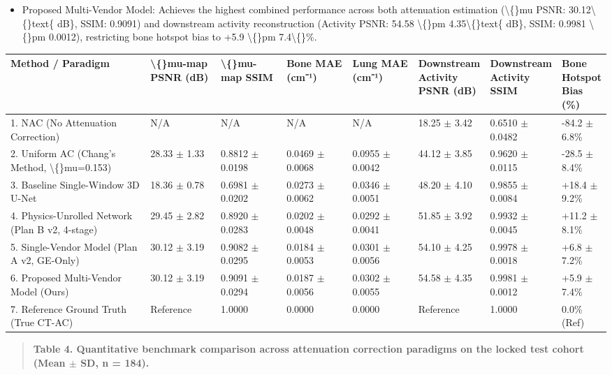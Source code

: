 \documentclass[11pt]{article}
\begin{document}
\begin{itemize}\item  Proposed Multi-Vendor Model: Achieves the highest combined performance across both attenuation estimation (\textbackslash\{\}mu PSNR: 30.12\textbackslash\{\}text\{ dB\}, SSIM: 0.9091) and downstream activity reconstruction (Activity PSNR: 54.58 \textbackslash\{\}pm 4.35\textbackslash\{\}text\{ dB\}, SSIM: 0.9981 \textbackslash\{\}pm 0.0012), restricting bone hotspot bias to +5.9 \textbackslash\{\}pm 7.4\textbackslash\{\}\%.\end{itemize}
\begingroup\small\setlength{\tabcolsep}{3pt}\begin{longtable}{p{0.32\linewidth}p{0.14\linewidth}p{0.14\linewidth}p{0.14\linewidth}p{0.14\linewidth}p{0.14\linewidth}p{0.14\linewidth}p{0.14\linewidth}}
\toprule
Method / Paradigm & \textbackslash\{\}mu-map PSNR (dB) & \textbackslash\{\}mu-map SSIM & Bone MAE (cm⁻¹) & Lung MAE (cm⁻¹) & Downstream Activity PSNR (dB) & Downstream Activity SSIM & Bone Hotspot Bias (\%) \\
\midrule
1. NAC (No Attenuation Correction) & N/A & N/A & N/A & N/A & 18.25 $\pm$ 3.42 & 0.6510 $\pm$ 0.0482 & -84.2 $\pm$ 6.8\% \\
2. Uniform AC (Chang's Method, \textbackslash\{\}mu=0.153) & 28.33 $\pm$ 1.33 & 0.8812 $\pm$ 0.0198 & 0.0469 $\pm$ 0.0068 & 0.0955 $\pm$ 0.0042 & 44.12 $\pm$ 3.85 & 0.9620 $\pm$ 0.0115 & -28.5 $\pm$ 8.4\% \\
3. Baseline Single-Window 3D U-Net & 18.36 $\pm$ 0.78 & 0.6981 $\pm$ 0.0202 & 0.0273 $\pm$ 0.0062 & 0.0346 $\pm$ 0.0051 & 48.20 $\pm$ 4.10 & 0.9855 $\pm$ 0.0084 & +18.4 $\pm$ 9.2\% \\
4. Physics-Unrolled Network (Plan B v2, 4-stage) & 29.45 $\pm$ 2.82 & 0.8920 $\pm$ 0.0283 & 0.0202 $\pm$ 0.0048 & 0.0292 $\pm$ 0.0041 & 51.85 $\pm$ 3.92 & 0.9932 $\pm$ 0.0045 & +11.2 $\pm$ 8.1\% \\
5. Single-Vendor Model (Plan A v2, GE-Only) & 30.12 $\pm$ 3.19 & 0.9082 $\pm$ 0.0295 & 0.0184 $\pm$ 0.0053 & 0.0301 $\pm$ 0.0056 & 54.10 $\pm$ 4.25 & 0.9978 $\pm$ 0.0018 & +6.8 $\pm$ 7.2\% \\
6. Proposed Multi-Vendor Model (Ours) & 30.12 $\pm$ 3.19 & 0.9091 $\pm$ 0.0294 & 0.0187 $\pm$ 0.0056 & 0.0302 $\pm$ 0.0055 & 54.58 $\pm$ 4.35 & 0.9981 $\pm$ 0.0012 & +5.9 $\pm$ 7.4\% \\
7. Reference Ground Truth (True CT-AC) & Reference & 1.0000 & 0.0000 & 0.0000 & Reference & 1.0000 & 0.0\% (Ref) \\
\bottomrule
\end{longtable}\endgroup
\begin{quote}\small\textbf{Table 4. Quantitative benchmark comparison across attenuation correction paradigms on the locked test cohort (Mean $\pm$ SD, n = 184).}\end{quote}
\end{document}
